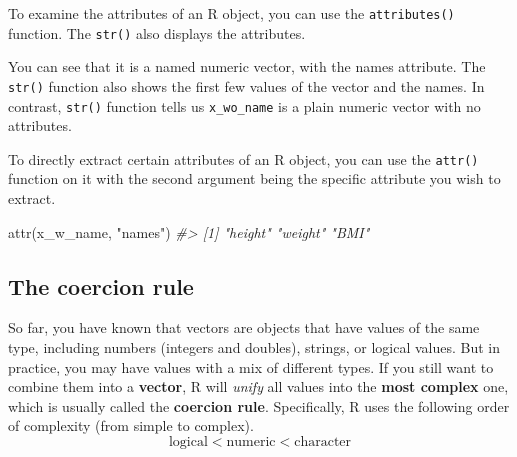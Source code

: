 \documentclass[
]{book}
\newenvironment{Shaded}{\begin{snugshade}}{\end{snugshade}}
\newcommand{\CommentTok}[1]{\textcolor[rgb]{0.56,0.35,0.01}{\textit{#1}}}
\newcommand{\FunctionTok}[1]{\textcolor[rgb]{0.00,0.00,0.00}{#1}}
\newcommand{\NormalTok}[1]{#1}
\newcommand{\StringTok}[1]{\textcolor[rgb]{0.31,0.60,0.02}{#1}}
\begin{document}
To examine the attributes of an R object, you can use the \texttt{attributes()} function. The \texttt{str()} also displays the attributes.

\begin{Shaded}
\end{Shaded}

You can see that it is a named numeric vector, with the names attribute. The \texttt{str()} function also shows the first few values of the vector and the names. In contrast, \texttt{str()} function tells us \texttt{x\_wo\_name} is a plain numeric vector with no attributes.

To directly extract certain attributes of an R object, you can use the \texttt{attr()} function on it with the second argument being the specific attribute you wish to extract.

\begin{Shaded}
\begin{Highlighting}[]
\FunctionTok{attr}\NormalTok{(x\_w\_name, }\StringTok{"names"}\NormalTok{)}
\CommentTok{\#\textgreater{} [1] "height" "weight" "BMI"}
\end{Highlighting}
\end{Shaded}

\hypertarget{coercion}{%
\subsection{The coercion rule}\label{coercion}}

So far, you have known that vectors are objects that have values of the same type, including numbers (integers and doubles), strings, or logical values. But in practice, you may have values with a mix of different types. If you still want to combine them into a \textbf{vector}, R will \emph{unify} all values into the \textbf{most complex} one, which is usually called the \textbf{coercion rule}. Specifically, R uses the following order of complexity (from simple to complex).
\[\mbox{logical} < \mbox{numeric} < \mbox{character}\]
\end{document}
